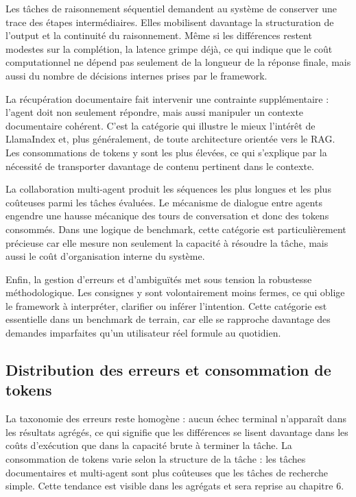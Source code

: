 \documentclass[11pt,a4paper]{article}
\begin{document}
Les tâches de raisonnement séquentiel demandent au système de conserver une trace des étapes intermédiaires. Elles mobilisent davantage la structuration de l'output et la continuité du raisonnement. Même si les différences restent modestes sur la complétion, la latence grimpe déjà, ce qui indique que le coût computationnel ne dépend pas seulement de la longueur de la réponse finale, mais aussi du nombre de décisions internes prises par le framework.

La récupération documentaire fait intervenir une contrainte supplémentaire : l'agent doit non seulement répondre, mais aussi manipuler un contexte documentaire cohérent. C'est la catégorie qui illustre le mieux l'intérêt de LlamaIndex et, plus généralement, de toute architecture orientée vers le RAG. Les consommations de tokens y sont les plus élevées, ce qui s'explique par la nécessité de transporter davantage de contenu pertinent dans le contexte.

La collaboration multi-agent produit les séquences les plus longues et les plus coûteuses parmi les tâches évaluées. Le mécanisme de dialogue entre agents engendre une hausse mécanique des tours de conversation et donc des tokens consommés. Dans une logique de benchmark, cette catégorie est particulièrement précieuse car elle mesure non seulement la capacité à résoudre la tâche, mais aussi le coût d'organisation interne du système.

Enfin, la gestion d'erreurs et d'ambiguïtés met sous tension la robustesse méthodologique. Les consignes y sont volontairement moins fermes, ce qui oblige le framework à interpréter, clarifier ou inférer l'intention. Cette catégorie est essentielle dans un benchmark de terrain, car elle se rapproche davantage des demandes imparfaites qu'un utilisateur réel formule au quotidien.

\subsection{Distribution des erreurs et consommation de tokens}
La taxonomie des erreurs reste homogène : aucun échec terminal n'apparaît dans les résultats agrégés, ce qui signifie que les différences se lisent davantage dans les coûts d'exécution que dans la capacité brute à terminer la tâche. La consommation de tokens varie selon la structure de la tâche : les tâches documentaires et multi-agent sont plus coûteuses que les tâches de recherche simple. Cette tendance est visible dans les agrégats et sera reprise au chapitre 6.
\end{document}
